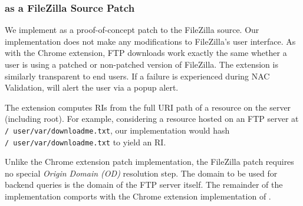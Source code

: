 
\subsubsection{\SYSTEM{} as a FileZilla Source Patch}

We implement \SYSTEM{} as a proof-of-concept patch to the FileZilla source.
Our implementation does not make any modifications to FileZilla's user
interface. As with the Chrome extension, FTP downloads work exactly the same
whether a user is using a patched or non-patched version of FileZilla. The
extension is similarly transparent to end users. If a failure is experienced
during NAC Validation, \SYSTEM{} will alert the user via a popup alert.

The extension computes RIs from the full URI path of a resource on the server
(including root). For example, considering a resource hosted on an FTP server at
\texttt{/~user/var/downloadme.txt}, our implementation would hash
\texttt{/~user/var/downloadme.txt} to yield an RI.

Unlike the Chrome extension patch implementation, the FileZilla patch requires
no special \emph{Origin Domain (OD)} resolution step. The domain to be used for
backend queries is the domain of the FTP server itself. The remainder of the
implementation comports with the Chrome extension implementation of \SYSTEM{}.
